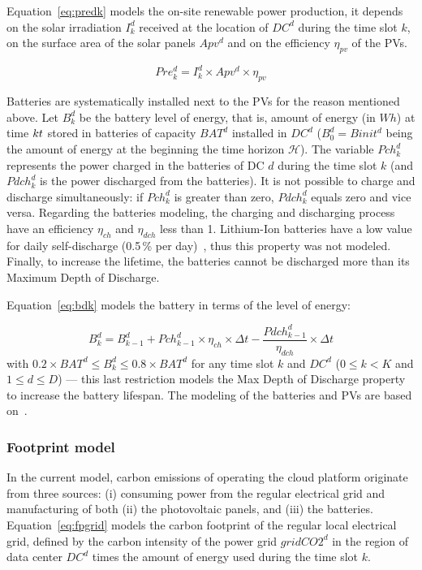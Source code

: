 Equation~\eqref{eq:predk} models the on-site renewable power production,  it depends on the solar irradiation $I^d_k$ received at the location of $DC^d$ during the time slot $k$, on the surface area of the solar panels $Apv^d$ and on the efficiency $\eta_{pv}$ of the PVs. 

\begin{equation} \label{eq:predk}
    Pre^d_{k}= I^d_k \times Apv^d \times \eta_{pv}
\end{equation}


Batteries are systematically installed next to the PVs for the reason mentioned above. Let $B^d_k$ be the battery level of energy, that is, amount of energy (in $Wh$) at time $k\time\Delta t$ stored in batteries of capacity $BAT^d$ installed in $DC^d$ ($B^d_0 = Binit^d$ being the amount of energy at the beginning the time horizon $\mathcal{H}$). The variable $Pch_k^d$ represents the power charged in the batteries of DC $d$ during the time slot $k$ (and $Pdch_k^d$ is the power discharged from the batteries). It is not possible to charge and discharge simultaneously: if $Pch^d_k$ is greater than zero, $Pdch^d_k$ equals zero and vice versa. Regarding the batteries modeling, the charging and discharging process have an efficiency $\eta_{ch}$ and $\eta_{dch}$ less than 1. Lithium-Ion batteries have a low value for daily self-discharge (0.5\,\% per day)~\cite{wang2012_EDCS}, thus this property was not modeled. Finally, to increase the lifetime, the batteries cannot be discharged more than its Maximum Depth of Discharge. 

Equation~\eqref{eq:bdk} models the battery in terms of the level of energy:

\begin{equation} \label{eq:bdk}
  B^d_k = B^d_{k-1}  + Pch^d_{k-1} \times \eta_{ch} \times \Delta{t} - \frac{Pdch^d_{k-1}}{\eta_{dch}} \times \Delta{t}
\end{equation}
with $0.2\times BAT^d \leq B^d_k\leq 0.8\times BAT^d$ for any time slot $k$ and $DC^d$ ($0\leq k<K$ and $1\leq d\leq D$) --- this last restriction models the Max Depth of Discharge property to increase the battery lifespan. The modeling of the batteries and PVs are based on~\cite{2021NICOD_ILP}.


\subsubsection{Footprint model} \label{sec:footprintmodel_ccgrid}


In the current model, carbon emissions of operating the cloud platform originate from three sources: (i) consuming power from the regular electrical grid and manufacturing of both (ii) the photovoltaic panels, and (iii) the batteries. Equation~\eqref{eq:fpgrid} models the carbon footprint of the regular local electrical grid, defined by the carbon intensity of the power grid $gridCO2^d$ in the region of data center $DC^d$  times the amount of energy used during the time slot $k$.

